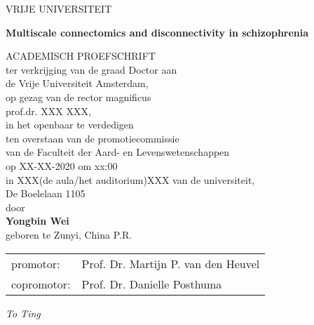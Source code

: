 \documentclass[10pt,twoside,b5paper,final]{book}
\def\maintitle{Multiscale connectomics and disconnectivity in schizophrenia}
\begin{document}
\begin{center}
\vspace*{1cm}
VRIJE UNIVERSITEIT\\
\vspace{1cm}
  {\LARGE\bfseries\maintitle\par}
  \vspace{1cm}
ACADEMISCH PROEFSCHRIFT\\
\vspace{2cm}
ter verkrijging van de graad Doctor aan\\
de Vrije Universiteit Amsterdam,\\
op gezag van de rector magnificus\\
prof.dr. XXX XXX,\\
in het openbaar te verdedigen\\
ten overstaan van de promotiecommissie\\
van de Faculteit der Aard- en Levenswetenschappen\\
op XX-XX-2020 om xx:00\\
in XXX(de aula/het auditorium)XXX van de universiteit,\\
De Boelelaan 1105\\
\vspace{1.4cm}
door\\
\vspace{1.4cm}
\textbf{Yongbin Wei}\\
\vspace{0.4cm}
geboren te Zunyi, China P.R.\\  
\end{center}
\newpage

\begin{tabular}{ll}
promotor: & Prof. Dr. Martijn P. van den Heuvel\\
copromotor: & Prof. Dr. Danielle Posthuma
\end{tabular}
\newpage

\pagestyle{empty}
\begin{center}
    \normalsize
    \vspace*{7cm}
    \textit{To Ting}
\end{center}
\newpage


\pagestyle{plain}

\tableofcontents
\newpage

\mainmatter


\justifying

% 

% 
% 
% 
\newpage
\newpage

\backmatter
\pagestyle{backmatter}



\end{document}
